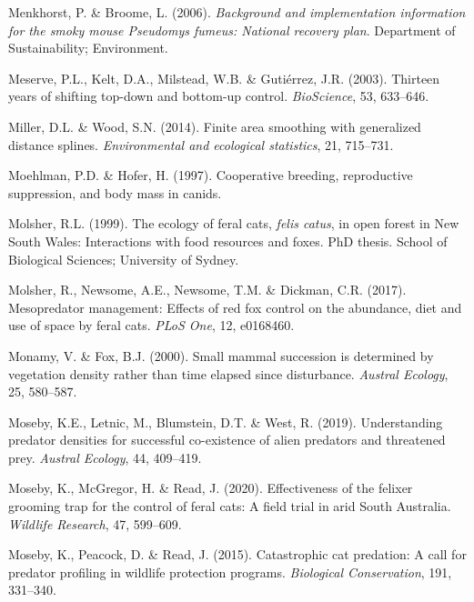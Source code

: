 \documentclass[11pt,a4paper,titlepage,twoside,openright]{style/unimelbthesis}
\begin{document}
\begin{mainmatter}
\leavevmode\hypertarget{ref-menkhorst2006background}{}%
Menkhorst, P. \& Broome, L. (2006). \emph{Background and implementation information for the smoky mouse Pseudomys fumeus: National recovery plan}. Department of Sustainability; Environment.

\leavevmode\hypertarget{ref-meserve2003thirteen}{}%
Meserve, P.L., Kelt, D.A., Milstead, W.B. \& Gutiérrez, J.R. (2003). Thirteen years of shifting top-down and bottom-up control. \emph{BioScience}, 53, 633--646.

\leavevmode\hypertarget{ref-miller2014finite}{}%
Miller, D.L. \& Wood, S.N. (2014). Finite area smoothing with generalized distance splines. \emph{Environmental and ecological statistics}, 21, 715--731.

\leavevmode\hypertarget{ref-moehlman1997cooperative}{}%
Moehlman, P.D. \& Hofer, H. (1997). Cooperative breeding, reproductive suppression, and body mass in canids.

\leavevmode\hypertarget{ref-molsher1999ecology}{}%
Molsher, R.L. (1999). The ecology of feral cats, \emph{felis catus}, in open forest in New South Wales: Interactions with food resources and foxes. PhD thesis. School of Biological Sciences; University of Sydney.

\leavevmode\hypertarget{ref-molsher2017mesopredator}{}%
Molsher, R., Newsome, A.E., Newsome, T.M. \& Dickman, C.R. (2017). Mesopredator management: Effects of red fox control on the abundance, diet and use of space by feral cats. \emph{PLoS One}, 12, e0168460.

\leavevmode\hypertarget{ref-monamy2000small}{}%
Monamy, V. \& Fox, B.J. (2000). Small mammal succession is determined by vegetation density rather than time elapsed since disturbance. \emph{Austral Ecology}, 25, 580--587.

\leavevmode\hypertarget{ref-moseby2019understanding}{}%
Moseby, K.E., Letnic, M., Blumstein, D.T. \& West, R. (2019). Understanding predator densities for successful co-existence of alien predators and threatened prey. \emph{Austral Ecology}, 44, 409--419.

\leavevmode\hypertarget{ref-moseby2020effectiveness}{}%
Moseby, K., McGregor, H. \& Read, J. (2020). Effectiveness of the felixer grooming trap for the control of feral cats: A field trial in arid South Australia. \emph{Wildlife Research}, 47, 599--609.

\leavevmode\hypertarget{ref-moseby2015catastrophic}{}%
Moseby, K., Peacock, D. \& Read, J. (2015). Catastrophic cat predation: A call for predator profiling in wildlife protection programs. \emph{Biological Conservation}, 191, 331--340.


\end{mainmatter}
\end{document}
